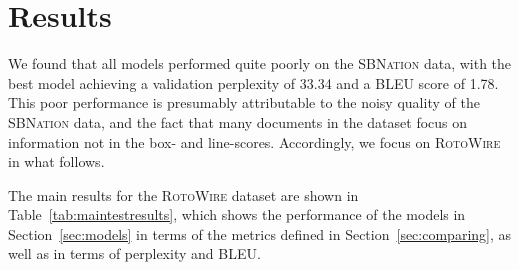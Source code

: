 \documentclass[11pt,letterpaper]{article}
\begin{document}
\section{Results}
We found that all models performed quite poorly on the \textsc{SBNation} data, with the best model achieving a validation perplexity of 33.34 and a BLEU score of 1.78. This poor performance is presumably attributable to the noisy quality of the \textsc{SBNation} data, and the fact that many documents in the dataset focus on information not in the box- and line-scores. Accordingly, we focus on \textsc{RotoWire} in what follows. 

The main results for the \textsc{RotoWire} dataset are shown in Table~\ref{tab:maintestresults}, which shows the performance of the models in Section~\ref{sec:models} in terms of the metrics defined in Section~\ref{sec:comparing}, as well as in terms of perplexity and BLEU. 
\end{document}
